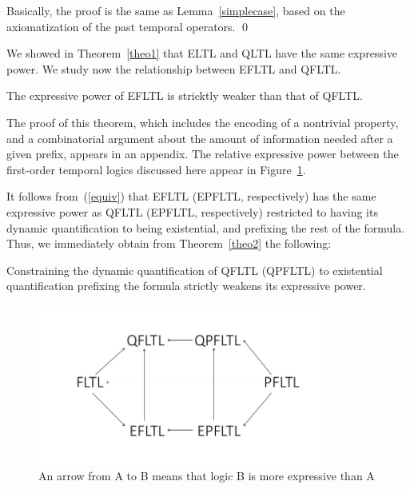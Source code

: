 
 Basically, the proof is the same as Lemma~\ref{simplecase}, based on the axiomatization of the
past temporal operators. \qed


We showed in Theorem~\ref{theo1} that ELTL
and QLTL have the same
expressive power. We study now the relationship between
EFLTL and QFLTL.

\begin{theorem}
\label{theo2}
The expressive power of EFLTL is stricktly weaker than that of QFLTL.
\end{theorem}
The proof of this theorem, which includes the encoding of a nontrivial property, and a combinatorial argument about the amount of information
needed after a given prefix, appears in an appendix.
The relative expressive power between the first-order temporal logics discussed here
appear in Figure~\ref{fsfr}.

It follows from~(\ref{equiv}) that EFLTL (EPFLTL, respectively) has the same
expressive power as QFLTL (EPFLTL, respectively) restricted to having its
dynamic 
quantification to being existential, and prefixing the
rest of the formula. Thus, we immediately obtain from Theorem~\ref{theo2} the following:

\begin{corollary}
Constraining the dynamic quantification of QFLTL (QPFLTL) to existential quantification prefixing the
formula strictly weakens its expressive power.
\end{corollary}



\begin{figure}
\begin{center}
\includegraphics[width=3.7in]{FIRST.jpg}
\caption{\label{fsfr} An arrow from A to B means that logic  B is more expressive than A}
\end{center}
\end{figure}


